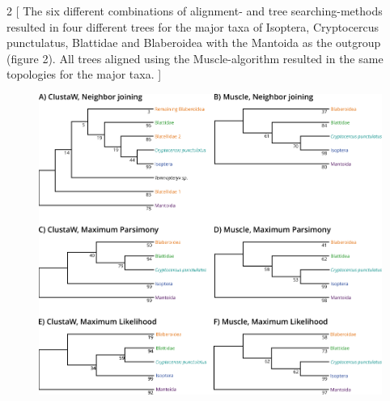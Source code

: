 \begin{multicols}{2}
    [
        The six different combinations of alignment- and tree searching-methods resulted in four different trees
        for the major taxa of Isoptera, Cryptocercus punctulatus, Blattidae and Blaberoidea with the Mantoida
        as the outgroup (figure 2). All trees aligned using the Muscle-algorithm resulted in the same topologies
        for the major taxa.
    ]
    \lipsum[2-6]
\end{multicols}

\begin{figure}[H]
    \centering
    \includegraphics[scale=1]{images/collapsed_trees.pdf}
    \vspace{0.5cm}
    \label{fig:majortaxa}
\end{figure}
